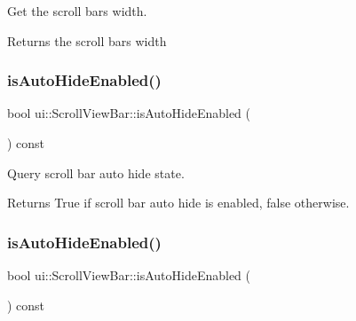 Get the scroll bar\textquotesingle{}s width. 

\begin{DoxyReturn}{Returns}
the scroll bar\textquotesingle{}s width 
\end{DoxyReturn}
\mbox{\label{classui_1_1ScrollViewBar_a23ca5a96001bc47c61f8d4b382ff8d02}} 
\subsubsection{\texorpdfstring{is\+Auto\+Hide\+Enabled()}{isAutoHideEnabled()}\hspace{0.1cm}{\footnotesize\ttfamily [1/2]}}
{\footnotesize\ttfamily bool ui\+::\+Scroll\+View\+Bar\+::is\+Auto\+Hide\+Enabled (\begin{DoxyParamCaption}{ }\end{DoxyParamCaption}) const\hspace{0.3cm}{\ttfamily [inline]}}



Query scroll bar auto hide state. 

\begin{DoxyReturn}{Returns}
True if scroll bar auto hide is enabled, false otherwise. 
\end{DoxyReturn}
\mbox{\label{classui_1_1ScrollViewBar_a23ca5a96001bc47c61f8d4b382ff8d02}} 
\subsubsection{\texorpdfstring{is\+Auto\+Hide\+Enabled()}{isAutoHideEnabled()}\hspace{0.1cm}{\footnotesize\ttfamily [2/2]}}
{\footnotesize\ttfamily bool ui\+::\+Scroll\+View\+Bar\+::is\+Auto\+Hide\+Enabled (\begin{DoxyParamCaption}{ }\end{DoxyParamCaption}) const\hspace{0.3cm}{\ttfamily [inline]}}



